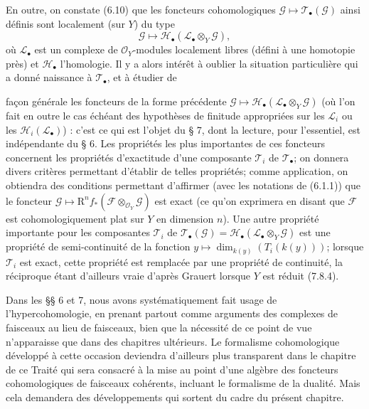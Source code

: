 \begin{env}[6.1.2]
En outre, on constate (6.10) que les foncteurs cohomologiques
$\mathscr G\mapsto\mathscr T_\bullet(\mathscr G)$ ainsi définis sont
localement (sur $Y$) du type
\[
  \mathscr G\longmapsto
  \mathscr H_\bullet(\mathscr L_\bullet\otimes_Y\mathscr G),
\]
où $\mathscr L_\bullet$ est un complexe de $\mathscr O_Y$-modules localement
libres (défini à une homotopie près) et $\mathscr H_\bullet$ l'homologie. Il y
a alors intérêt à oublier la situation particulière qui a donné naissance à
$\mathscr T_\bullet$, et à étudier de


façon générale les foncteurs de la forme précédente
$\mathscr G\mapsto\mathscr H_\bullet(\mathscr L_\bullet\otimes_Y\mathscr G)$
(où l'on fait en outre le cas échéant des hypothèses de finitude appropriées
sur les $\mathscr L_i$ ou les $\mathscr H_i(\mathscr L_\bullet)$) : c'est ce
qui est l'objet du § 7, dont la lecture, pour l'essentiel, est indépendante du
§ 6. Les propriétés les plus importantes de ces foncteurs concernent les
propriétés d'exactitude d'une composante $\mathscr T_i$ de
$\mathscr T_\bullet$; on donnera divers critères permettant d'établir de
telles propriétés; comme application, on obtiendra des conditions permettant
d'affirmer (avec les notations de (6.1.1)) que le foncteur
$\mathscr G\mapsto\mathrm R^n f_*(\mathscr F\otimes_{\mathscr O_Y}\mathscr G)$
est exact (ce qu'on exprimera en disant que $\mathscr F$ est
cohomologiquement plat sur $Y$ en dimension $n$). Une autre propriété
importante pour les composantes $\mathscr T_i$ de
$\mathscr T_\bullet(\mathscr G)=
\mathscr H_\bullet(\mathscr L_\bullet\otimes_Y\mathscr G)$ est une propriété
de semi-continuité de la fonction
$y\mapsto\dim_{k(y)}(T_i(k(y)))$; lorsque $\mathscr T_i$ est exact, cette
propriété est remplacée par une propriété de continuité, la réciproque étant
d'ailleurs vraie d'après Grauert lorsque $Y$ est réduit (7.8.4).
\end{env}

\begin{env}[6.1.3]
Dans les §§ 6 et 7, nous avons systématiquement fait usage de
l'hypercohomologie, en prenant partout comme arguments des complexes de
faisceaux au lieu de faisceaux, bien que la nécessité de ce point de vue
n'apparaisse que dans des chapitres ultérieurs. Le formalisme cohomologique
développé à cette occasion deviendra d'ailleurs plus transparent dans le
chapitre de ce Traité qui sera consacré à la mise au point d'une algèbre des
foncteurs cohomologiques de faisceaux cohérents, incluant le formalisme de la
dualité. Mais cela demandera des développements qui sortent du cadre du
présent chapitre.
\end{env}

